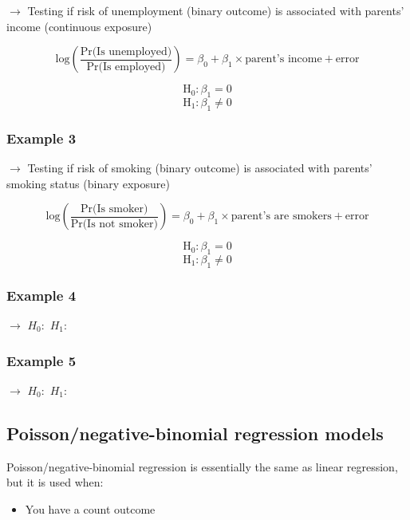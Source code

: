 \documentclass[12pt,]{article}
\providecommand{\tightlist}{%
  \setlength{\itemsep}{0pt}\setlength{\parskip}{0pt}}
\begin{document}
\(\rightarrow\) Testing if risk of unemployment (binary outcome) is
associated with parents' income (continuous exposure)

\[\text{log}\left(\frac{\text{Pr(Is unemployed)}}{\text{Pr(Is employed)}}\right) = \beta_0 + \beta_1 \times \text{parent's income} + \text{error}\]

\[\text{H}_0: \beta_1 = 0\] \[\text{H}_1: \beta_1 \ne 0\]

\subsubsection{Example 3}\label{example-3-6}

\(\rightarrow\) Testing if risk of smoking (binary outcome) is
associated with parents' smoking status (binary exposure)

\[\text{log}\left(\frac{\text{Pr(Is smoker)}}{\text{Pr(Is not smoker)}}\right) = \beta_0 + \beta_1 \times \text{parent's are smokers} + \text{error}\]

\[\text{H}_0: \beta_1 = 0\] \[\text{H}_1: \beta_1 \ne 0\]

\subsubsection{Example 4}\label{example-4-5}

\(\rightarrow\) \hfill \break
\hfill \break
\hfill \break
\hfill \break
\hfill \break
\hfill \break
\(H_0:\) \hfill \break
\hfill \break
\hfill \break
\(H_1:\)

\subsubsection{Example 5}\label{example-5-1}

\(\rightarrow\) \hfill \break
\hfill \break
\hfill \break
\hfill \break
\hfill \break
\hfill \break
\(H_0:\) \hfill \break
\hfill \break
\hfill \break
\(H_1:\)

\newpage

\subsection{Poisson/negative-binomial regression
models}\label{poissonnegative-binomial-regression-models}

Poisson/negative-binomial regression is essentially the same as linear
regression, but it is used when:

\begin{itemize}
\tightlist
\item
  You have a count outcome
\end{itemize}
\end{document}
